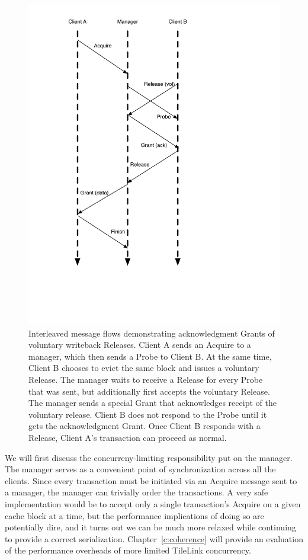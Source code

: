 \begin{figure}[!p]
\centering
\includegraphics[width=0.5\columnwidth]{tilelink/figures/rel-merge.pdf}
\caption[Interleaved message flows demonstrating acknowledgment Grants of voluntary writeback Releases.]{
Interleaved message flows demonstrating acknowledgment Grants of voluntary writeback Releases.
Client A sends an Acquire to a manager, which then sends a Probe to Client B.
At the same time, Client B chooses to evict the same block and issues a voluntary Release.
The manager waits to receive a Release for every Probe that was sent, but additionally first accepts the voluntary Release.
The manager sends a special Grant that acknowledges receipt of the voluntary release.
Client B does not respond to the Probe until it gets the acknowledgment Grant.
Once Client B responds with a Release, Client A's transaction can proceed as normal.
}
\label{fig:rel-merge}
\end{figure}

We will first discuss the concurreny-limiting responsibility put on the manager.
The manager serves as a convenient point of synchronization across all the clients.
Since every transaction must be initiated via an Acquire message sent to a manager, the manager can trivially order the transactions.
A very safe implementation would be to accept only a single transaction's Acquire on a given cache block at a time,
but the performance implications of doing so are potentially dire, and it turns out we can be much more relaxed while continuing to provide a correct serialization.
Chapter~\ref{c:coherence} will provide an evaluation of the performance overheads of more limited TileLink concurrency.

